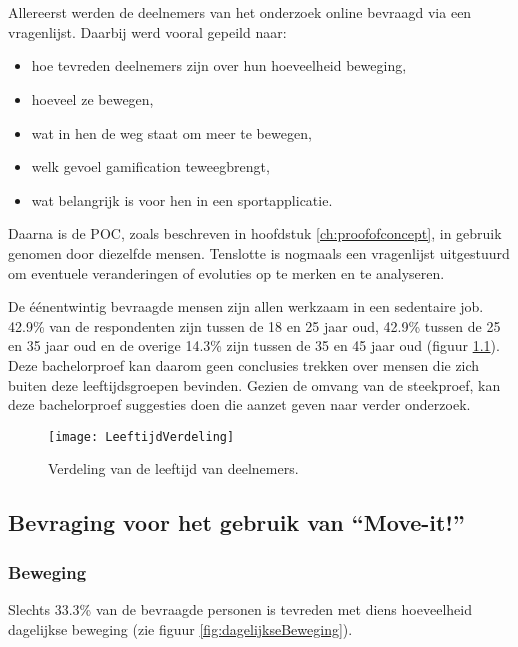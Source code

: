 \chapter{}%
\label{ch:analyse}

Allereerst werden de deelnemers van het onderzoek online bevraagd via een vragenlijst. Daarbij werd vooral gepeild naar:
\begin{itemize}
    \item hoe tevreden deelnemers zijn over hun hoeveelheid beweging,
    \item hoeveel ze bewegen,
    \item wat in hen de weg staat om meer te bewegen,
    \item welk gevoel gamification teweegbrengt,
    \item wat belangrijk is voor hen in een sportapplicatie.
\end{itemize}

Daarna is de POC, zoals beschreven in hoofdstuk \ref{ch:proofofconcept}, in gebruik genomen door diezelfde mensen. Tenslotte is nogmaals een vragenlijst uitgestuurd om eventuele veranderingen of evoluties op te merken en te analyseren.

De éénentwintig bevraagde mensen zijn allen werkzaam in een sedentaire job. 42.9\% van de respondenten zijn tussen de 18 en 25 jaar oud, 42.9\% tussen de 25 en 35 jaar oud en de overige 14.3\% zijn tussen de 35 en 45 jaar oud (figuur \ref{fig:leeftijd}). Deze bachelorproef kan daarom geen conclusies trekken over mensen die zich buiten deze leeftijdsgroepen bevinden. Gezien de omvang van de steekproef, kan deze bachelorproef suggesties doen die aanzet geven naar verder onderzoek.

\begin{figure}
    \caption[Verdeling van de leeftijd van deelnemers]{Verdeling van de leeftijd van deelnemers.}
    \texttt{[image: LeeftijdVerdeling]}
    \label{fig:leeftijd}
\end{figure}

\section{Bevraging voor het gebruik van ``Move-it!''}

\subsection{Beweging}
Slechts 33.3\% van de bevraagde personen is tevreden met diens hoeveelheid dagelijkse beweging (zie figuur \ref{fig:dagelijkseBeweging}).

